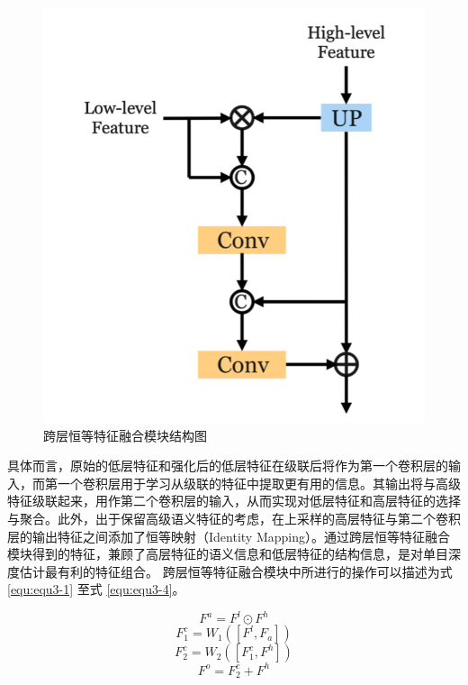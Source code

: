 \begin{figure}[!htbp]
	\centering
	\includegraphics[scale=0.98]{figures/18.png}
	\caption{跨层恒等特征融合模块结构图}
	\label{fig:fig3-2}
\end{figure}

具体而言，原始的低层特征和强化后的低层特征在级联后将作为第一个卷积层的输入，而第一个卷积层用于学习从级联的特征中提取更有用的信息。其输出将与高级特征级联起来，用作第二个卷积层的输入，从而实现对低层特征和高层特征的选择与聚合。此外，出于保留高级语义特征的考虑，在上采样的高层特征与第二个卷积层的输出特征之间添加了恒等映射（Identity Mapping）。通过跨层恒等特征融合模块得到的特征，兼顾了高层特征的语义信息和低层特征的结构信息，是对单目深度估计最有利的特征组合。
跨层恒等特征融合模块中所进行的操作可以描述为式 \ref{equ:equ3-1} 至式 \ref{equ:equ3-4}。

\begin{equation}
	F^a=F^l\odot F^h
	\label{equ:equ3-1}
\end{equation}
\begin{equation}
	F_1^c=W_1\left(\left[F^l,F_a\right]\right)
	\label{equ:equ3-2}
\end{equation}
\begin{equation}
	F_2^c=W_2\left(\left[F_1^c,F^h\right]\right)
	\label{equ:equ3-3}
\end{equation}
\begin{equation}
	F^o=F_2^c+F^h
	\label{equ:equ3-4}
\end{equation}


